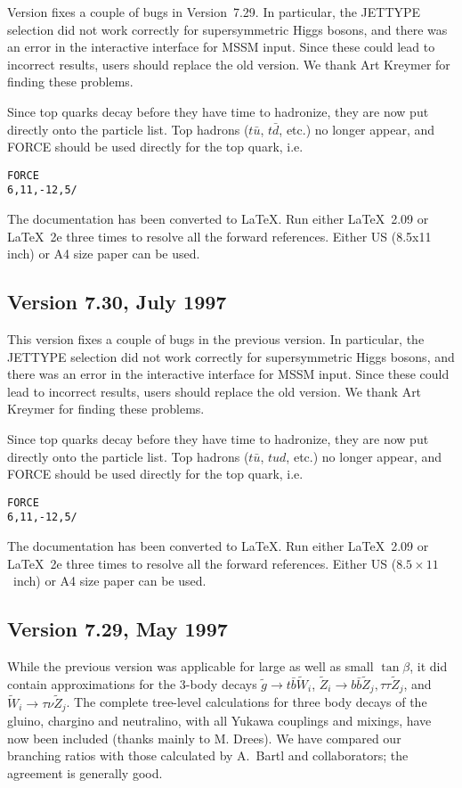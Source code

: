         Version fixes a couple of bugs in Version~7.29. In
particular, the JETTYPE selection did not work correctly for
supersymmetric Higgs bosons, and there was an error in the interactive
interface for MSSM input. Since these could lead to incorrect results,
users should replace the old version. We thank Art Kreymer for finding
these problems. 

        Since top quarks decay before they have time to hadronize,
they are now put directly onto the particle list. Top hadrons ($t\bar
u$, $t\bar d$, etc.) no longer appear, and FORCE should be used
directly for the top quark, i.e.
\begin{verbatim}
FORCE
6,11,-12,5/
\end{verbatim}

        The documentation has been converted to LaTeX. Run either
LaTeX~2.09 or LaTeX~2e three times to resolve all the forward
references. Either US (8.5x11 inch) or A4 size paper can be used.

\subsection{Version 7.30, July 1997}

        This version fixes a couple of bugs in the previous version.
In particular, the JETTYPE selection did not work correctly for
supersymmetric Higgs bosons, and there was an error in the interactive
interface for MSSM input. Since these could lead to incorrect results,
users should replace the old version. We thank Art Kreymer for finding
these problems. 

        Since top quarks decay before they have time to hadronize,
they are now put directly onto the particle list. Top hadrons ($t\bar
u$, $tud$, etc.) no longer appear, and FORCE should be used directly
for the top quark, i.e.
\begin{verbatim}
FORCE
6,11,-12,5/
\end{verbatim}

        The documentation has been converted to \LaTeX. Run either
\LaTeX~2.09 or \LaTeX~2e three times to resolve all the forward
references. Either US ($8.5\times11$~inch) or A4 size paper can be
used.

\subsection{Version 7.29, May 1997}

      While the previous version was applicable for large as well as
small $\tan\beta$, it did contain approximations for the 3-body decays
$\tilde g \to t \bar b \tilde W_i$, $\tilde Z_i \to b \bar b \tilde
Z_j, \tau \tau \tilde Z_j$, and $\tilde W_i \to \tau \nu \tilde Z_j$.
The complete tree-level calculations for three body decays of the
gluino, chargino and neutralino, with all Yukawa couplings and
mixings, have now been included (thanks mainly to M. Drees).  We have
compared our branching ratios with those calculated by A.~Bartl and
collaborators; the agreement is generally good.

